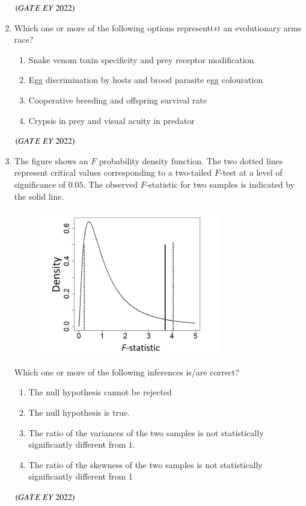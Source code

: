 \documentclass[journal]{IEEEtran}
\numberwithin{equation}{enumi}
\numberwithin{figure}{enumi}
\begin{document}
\begin{enumerate}
\begin{enumerate}
    \end{enumerate}
    \hfill{$\brak{ GATE\ EY\ 2022}$}
    \bigskip
 \item Which one or more of the following options represent$\left(s\right)$ an evolutionary arms race?
    \begin{enumerate}
        \item Snake venom toxin specificity and prey receptor modification 
        \item  Egg discrimination by hosts and brood parasite egg colouration
        \item  Cooperative breeding and offspring survival rate
        \item  Crypsis in prey and visual acuity in predator
    \end{enumerate}
    \hfill{$\brak{ GATE\ EY\ 2022}$}
    \bigskip
 \item The figure shows an $F$ probability density function. The two dotted lines represent
critical values corresponding to a two-tailed $F$-test at a level of significance of $0.05$.
The observed $F$-statistic for two samples is indicated by the solid line.
\begin{figure}[H]
    \centering
\includegraphics[width=0.5\columnwidth]{figs/17.png}
    \caption{}
    \label{fig:17}
   \end{figure}
Which one or more of the following inferences is/are correct?
    \begin{enumerate}
        \item  The null hypothesis cannot be rejected
        \item  The null hypothesis is true.
        \item  The ratio of the variances of the two samples is not statistically significantly
different from $1$.
        \item  The ratio of the skewness of the two samples is not statistically significantly
different from $1$
    \end{enumerate}
    \hfill{$\brak{ GATE\ EY\ 2022}$}

\end{enumerate}
\end{document}
